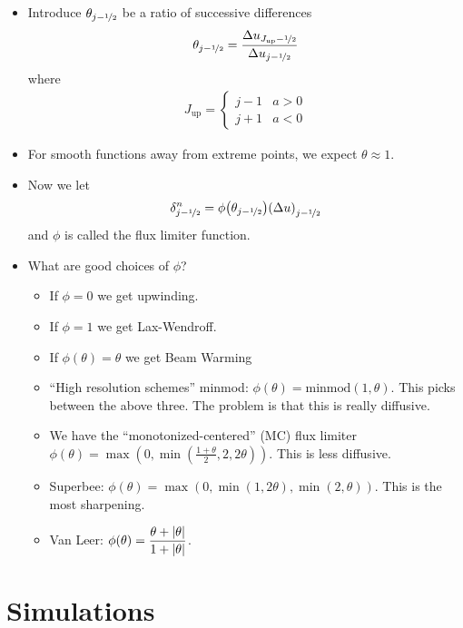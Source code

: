 \documentclass{article}
\newcommand{\half}{\nicefrac{1}{2}}
\begin{document}
\begin{itemize}
            \item Introduce $\theta_{j-\half}$ be a ratio of successive differences
            \begin{align*}
                \theta_{j-\half} = \frac{\Delta u_{J_\text{up}-\half}}{\Delta u_{j-\half}}
            \end{align*}
            where
            \begin{align*}
                J_\text{up} = \begin{cases}
                    j-1 & a > 0 \\
                    j+1 & a < 0
                \end{cases}
            \end{align*}
            \item For smooth functions away from extreme points, we expect $\theta\approx1$.
            \item Now we let
            \begin{align*}
                \delta_{j-\half}^n = \phi\qty(\theta_{j-\half})\qty(\Delta u)_{j-\half}
            \end{align*}
            and $\phi$ is called the flux limiter function.
            \item What are good choices of $\phi$?
            \begin{itemize}
                \item If $\phi = 0$ we get upwinding.
                \item If $\phi = 1$ we get Lax-Wendroff.
                \item If $\phi(\theta) = \theta$ we get Beam Warming
                \item ``High resolution schemes'' minmod: $\phi(\theta) = \text{minmod}(1,\theta)$.  This picks between the above three.  The problem is that this is really diffusive.
                \item We have the ``monotonized-centered'' (MC) flux limiter $\phi(\theta) = \max(0,\min(\frac{1+\theta}{2},2,2\theta))$.  This is less diffusive.
                \item Superbee: $\phi(\theta) = \max(0,\min(1,2\theta),\min(2,\theta))$.  This is the most sharpening.
                \item Van Leer: $\phi(\theta) = \dfrac{\theta + \abs{\theta}}{1 + \abs{\theta}}$.
            \end{itemize}
        \end{itemize}

    \section{Simulations}
\end{document}
